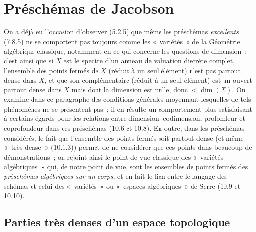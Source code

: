 \section{Préschémas de Jacobson}
\label{section:IV.10-fr}

On a déjà eu l'occasion d'observer (5.2.5) que même les préschémas
\emph{excellents} (7.8.5) ne se comportent pas toujours comme les
«~variétés~» de la Géométrie algébrique classique, notamment en ce qui
concerne les questions de dimension~; c'est ainsi que si $X$ est le spectre
d'un anneau de valuation discrète complet, l'ensemble des points fermés de
$X$ (réduit à un seul élément) n'est pas partout dense dans $X$, et que son
complémentaire (réduit à un seul élément) est un ouvert partout dense dans
$X$ mais dont la dimension est nulle, donc $<\dim(X)$. On examine dans ce
paragraphe des conditions générales moyennant lesquelles de tels phénomènes
ne se présentent pas~; il en résulte un comportement plus satisfaisant à
certains égards pour les relations entre dimension, codimension, profondeur
et coprofondeur dans ces préschémas (10.6 et 10.8). En outre, dans les
préschémas considérés, le fait que l'ensemble des points fermés soit partout
dense (et même «~très dense~» (10.1.3)) permet de ne considérer que ces points
dans beaucoup de démonstrations~; on rejoint ainsi le point de vue classique
des «~variétés algébriques~» qui, de notre point de vue, sont les ensembles
de points fermés des \emph{préschémas algébriques sur un corps}, et on fait le
lien entre le langage des schémas et celui des «~variétés~» ou «~espaces
algébriques~» de Serre (10.9 et 10.10).

\subsection{Parties très denses d'un espace topologique}
\label{subsection:IV.10.1-fr}

